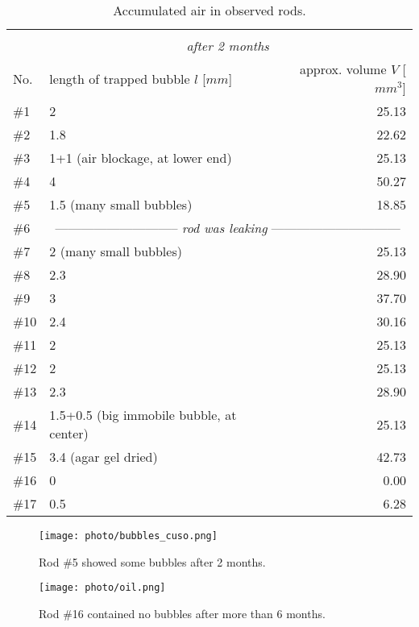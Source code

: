 \begin{table}[tbh!]
\centering
\caption{Accumulated air in observed rods.}
\begin{tabular}{l|lr}
\multicolumn{3}{c}{}								\\
& \multicolumn{2}{c}{\textit{after 2 months}}					\\ 
No. & length of trapped bubble $l$ [$mm$] 	& approx. volume $V$ [$mm^3$]	\\
\toprule
\#1   & 2					& 25.13				\\
\#2   & 1.8					& 22.62				\\
\#3   & 1+1 (air blockage, at lower end)	& 25.13				\\
\#4   & 4					& 50.27				\\
\#5   & 1.5 (many small bubbles)		& 18.85				\\
\#6   & \multicolumn{2}{c}{-----------------------------\textit{ rod was leaking }------------------------------}\\
\#7   & 2 (many small bubbles)			& 25.13				\\
\#8   & 2.3					& 28.90				\\
\#9   & 3					& 37.70				\\
\#10  & 2.4					& 30.16				\\
\#11  & 2					& 25.13				\\
\#12  & 2					& 25.13				\\
\#13  & 2.3					& 28.90				\\
\#14  & 1.5+0.5 (big immobile bubble, at center)	& 25.13				\\
\#15  & 3.4 (agar gel dried)			& 42.73				\\
\#16  & 0					& 0.00				\\
\#17  & 0.5					& 6.28				\\
\bottomrule
\end{tabular}
\label{tab:bubbles2}
\end{table}


\begin{figure}[tbh!]
\centering
\texttt{[image: photo/bubbles\_cuso.png]}
\caption{Rod \#5 showed some bubbles after 2 months.}
\label{fig:bubbles_cuso}
\end{figure}

\begin{figure}[tbh!]
\centering
\texttt{[image: photo/oil.png]}
\caption{Rod \#16 contained no bubbles after more than 6 months.}
\label{fig:bubbles_oil}
\end{figure}

